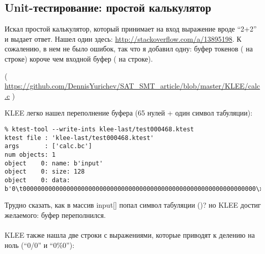 \subsection{Unit-тестирование: простой калькулятор}

Искал простой калькулятор, который принимает на вход выражение вроде ``2+2'' и выдает ответ.
Нашел один здесь: \url{http://stackoverflow.com/a/13895198}.
К сожалению, в нем не было ошибок, так что я добавил одну: буфер токенов ( на строке) короче чем входной буфер ( на строке).


( \url{https://github.com/DennisYurichev/SAT_SMT_article/blob/master/KLEE/calc.c} )

KLEE легко нашел переполнение буфера (65 нулей + один символ табуляции):

\begin{lstlisting}
% ktest-tool --write-ints klee-last/test000468.ktest
ktest file : 'klee-last/test000468.ktest'
args       : ['calc.bc']
num objects: 1
object    0: name: b'input'
object    0: size: 128
object    0: data: b'0\t0000000000000000000000000000000000000000000000000000000000000000\xff\xff\xff\xff\xff\xff\xff\xff\xff\xff\xff\xff\xff\xff\xff\xff\xff\xff\xff\xff\xff\xff\xff\xff\xff\xff\xff\xff\xff\xff\xff\xff\xff\xff\xff\xff\xff\xff\xff\xff\xff\xff\xff\xff\xff\xff\xff\xff\xff\xff\xff\xff\xff\xff\xff\xff\xff\xff\xff\xff\xff\xff'
\end{lstlisting}

Трудно сказать, как в массив input[] попал символ табуляции ()? но KLEE достиг желаемого: буфер переполнился.\\
\\
KLEE также нашла две строки с выражениями, которые приводят к делению на ноль (``0/0'' и ``0\%0''):

